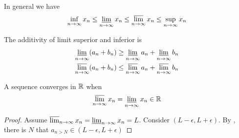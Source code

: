 In general we have 
\begin{equation}
    \inf_{n \rightarrow \infty} x_n \leq \varliminf_{n \rightarrow \infty} x_n \leq \varlimsup_{n \rightarrow \infty} x_n \leq \sup_{n \rightarrow \infty} x_n
\end{equation}

The additivity of limit superior and inferior is
\begin{equation}
    \begin{aligned}
        \varliminf_{n \rightarrow \infty} (a_n + b_n) &\geq \varliminf_{n \rightarrow \infty} a_n + \varliminf_{n \rightarrow \infty} b_n \\
        \varlimsup_{n \rightarrow \infty} (a_n + b_n) &\leq \varlimsup_{n \rightarrow \infty} a_n + \varlimsup_{n \rightarrow \infty} b_n \\
    \end{aligned}
\end{equation}


\begin{theorem}
    A sequence converges in $\mathbb{R}$ when 
    \begin{equation}
        \varlimsup_{n\rightarrow \infty} x_n = \varliminf_{n\rightarrow \infty} x_n \in \mathbb{R}
    \end{equation}
\end{theorem}
\begin{proof}
    Assume $\varlimsup_{n\rightarrow \infty} x_n = \varliminf_{n\rightarrow \infty} x_n = L$. Consider $(L - \epsilon, L + \epsilon)$. By , there is $N$ that $a_{n > N} \in (L - \epsilon, L + \epsilon)$
\end{proof}


